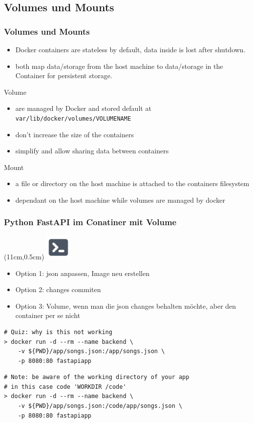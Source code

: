 \documentclass[22pt]{beamer}
\newcommand{\code}[1]{\colorbox{gray!10}{\texttt{#1}}}
\newcommand{\terminal}{
    \begin{textblock*}{1.3cm}(11cm,0.5cm) %
    \includegraphics[width=1.3cm]{Bilder/terminal.png}
    \end{textblock*}
}
\begin{document}
\subsection{Volumes und Mounts}
\begin{frame}[t]
    \frametitle{Volumes und Mounts}
    \begin{itemize}
        \item Docker containers are stateless by default, data inside is lost after shutdown.
        \item both map data/storage from the host machine to data/storage in the Container for persistent storage.
    \end{itemize} \pause
    \begin{block}{Volume}
        \begin{itemize}
            \item are managed by Docker and stored default at \code{var/lib/docker/volumes/VOLUMENAME}
            \item don't increase the size of the containers
            \item simplify and allow sharing data between containers
        \end{itemize}
    \end{block} \pause
    \begin{block}{Mount}
        \begin{itemize}
            \item a file or directory on the host machine is attached to the containers filesystem
            \item dependant on the host machine while volumes are managed by docker
        \end{itemize}
    \end{block}
\end{frame}

\begin{frame}[fragile]
    \frametitle{Python FastAPI im Conatiner mit Volume}
    \terminal
    \begin{itemize}
        \item Option 1: json anpassen, Image neu erstellen
        \item Option 2: changes commiten
        \item Option 3: Volume, wenn man die json changes behalten möchte, aber den container per se nicht
    \end{itemize}

\begin{verbatim}
# Quiz: why is this not working
> docker run -d --rm --name backend \
    -v ${PWD}/app/songs.json:/app/songs.json \
    -p 8080:80 fastapiapp
\end{verbatim}
    \pause
\begin{verbatim}
# Note: be aware of the working directory of your app
# in this case code 'WORKDIR /code'
> docker run -d --rm --name backend \
    -v ${PWD}/app/songs.json:/code/app/songs.json \
    -p 8080:80 fastapiapp    
\end{verbatim}
            
\end{frame}
\end{document}
